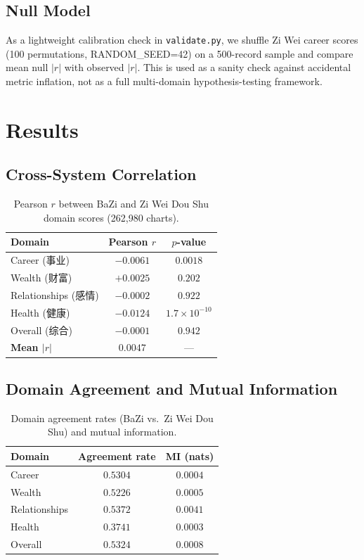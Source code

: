 \documentclass[11pt]{article}
\begin{document}
\subsection{Null Model}

As a lightweight calibration check in \texttt{validate.py}, we shuffle Zi Wei career scores (100 permutations, RANDOM\_SEED=42) on a 500-record sample and compare mean null $|r|$ with observed $|r|$.
This is used as a sanity check against accidental metric inflation, not as a full multi-domain hypothesis-testing framework.

\section{Results}

\subsection{Cross-System Correlation}

\begin{table}[h]
\centering
\small
\caption{Pearson $r$ between BaZi and Zi Wei Dou Shu domain scores (262,980 charts).}
\label{tab:correlation}
\begin{tabular}{lcc}
\toprule
\textbf{Domain} & \textbf{Pearson $r$} & \textbf{$p$-value} \\
\midrule
Career (事业)              & $-0.0061$ & $0.0018$ \\
Wealth (财富)              & $+0.0025$ & $0.202$ \\
Relationships (感情)       & $-0.0002$ & $0.922$ \\
Health (健康)              & $-0.0124$ & $1.7\times 10^{-10}$ \\
Overall (综合)             & $-0.0001$ & $0.942$ \\
\midrule
\textbf{Mean $|r|$} & $0.0047$ & --- \\
\bottomrule
\end{tabular}
\end{table}

\subsection{Domain Agreement and Mutual Information}

\begin{table}[h]
\centering
\small
\caption{Domain agreement rates (BaZi vs.\ Zi Wei Dou Shu) and mutual information.}
\label{tab:mi}
\begin{tabular}{lcc}
\toprule
\textbf{Domain} & \textbf{Agreement rate} & \textbf{MI (nats)} \\
\midrule
Career        & $0.5304$ & $0.0004$ \\
Wealth        & $0.5226$ & $0.0005$ \\
Relationships & $0.5372$ & $0.0041$ \\
Health        & $0.3741$ & $0.0003$ \\
Overall       & $0.5324$ & $0.0008$ \\
\bottomrule
\end{tabular}
\end{table}
\end{document}
